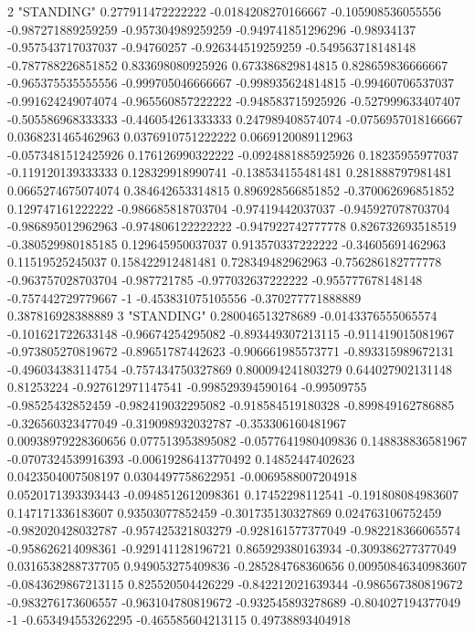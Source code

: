 2 "STANDING" 0.277911472222222 -0.0184208270166667 -0.105908536055556 -0.987271889259259 -0.957304989259259 -0.949741851296296 -0.98934137 -0.957543717037037 -0.94760257 -0.926344519259259 -0.549563718148148 -0.787788226851852 0.833698080925926 0.673386829814815 0.828659836666667 -0.965375535555556 -0.999705046666667 -0.998935624814815 -0.99460706537037 -0.991624249074074 -0.965560857222222 -0.948583715925926 -0.527999633407407 -0.505586968333333 -0.446054261333333 0.247989408574074 -0.0756957018166667 0.0368231465462963 0.0376910751222222 0.0669120089112963 -0.0573481512425926 0.176126990322222 -0.0924881885925926 0.18235955977037 -0.119120139333333 0.128329918990741 -0.138534155481481 0.281888797981481 0.0665274675074074 0.384642653314815 0.896928566851852 -0.370062696851852 0.129747161222222 -0.986685818703704 -0.97419442037037 -0.945927078703704 -0.986895012962963 -0.974806122222222 -0.947922742777778 0.826732693518519 -0.380529980185185 0.129645950037037 0.913570337222222 -0.34605691462963 0.11519525245037 0.158422912481481 0.728349482962963 -0.756286182777778 -0.963757028703704 -0.987721785 -0.977032637222222 -0.955777678148148 -0.757442729779667 -1 -0.453831075105556 -0.370277771888889 0.387816928388889
3 "STANDING" 0.280046513278689 -0.0143376555065574 -0.101621722633148 -0.96674254295082 -0.893449307213115 -0.911419015081967 -0.973805270819672 -0.89651787442623 -0.906661985573771 -0.893315989672131 -0.496034383114754 -0.757434750327869 0.800094241803279 0.644027902131148 0.81253224 -0.927612971147541 -0.998529394590164 -0.99509755 -0.98525432852459 -0.982419032295082 -0.918584519180328 -0.899849162786885 -0.326560323477049 -0.319098932032787 -0.353306160481967 0.00938979228360656 0.077513953895082 -0.0577641980409836 0.148838836581967 -0.0707324539916393 -0.00619286413770492 0.14852447402623 0.0423504007508197 0.0304497758622951 -0.0069588007204918 0.0520171393393443 -0.0948512612098361 0.17452298112541 -0.191808084983607 0.147171336183607 0.93503077852459 -0.301735130327869 0.024763106752459 -0.982020428032787 -0.957425321803279 -0.928161577377049 -0.982218366065574 -0.958626214098361 -0.929141128196721 0.865929380163934 -0.309386277377049 0.0316538288737705 0.949053275409836 -0.285284768360656 0.00950846340983607 -0.0843629867213115 0.825520504426229 -0.842212021639344 -0.986567380819672 -0.983276173606557 -0.963104780819672 -0.932545893278689 -0.804027194377049 -1 -0.653494553262295 -0.465585604213115 0.49738893404918
